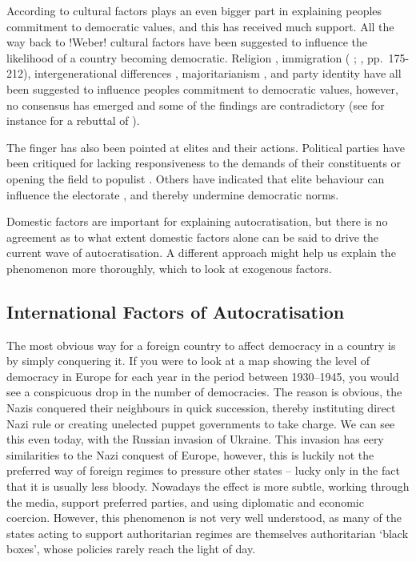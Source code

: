 According to \citet{margalit_economic_2019} cultural factors plays an even bigger part in explaining peoples commitment to democratic values, and this has received much support. All the way back to !Weber! cultural factors have been suggested to influence the likelihood of a country becoming democratic. Religion \citep[pp.72-85]{huntington_third_1991}, immigration (\citeauthor{dinas_waking_2019} \citeyear{dinas_waking_2019}; \citeauthor{norris_cultural_2019} \citeyear{norris_cultural_2019}, pp.~175-212), intergenerational differences \citep{foa_youth_2020, foa_danger_2016, norris_cultural_2019, wuttke_have_2022}, majoritarianism \citep{grossman_majoritarian_2022, wunsch_demand_2023}, and party identity \citep{abramowitz_united_2019, bisgaard_how_2019, graham_democracy_2020, iyengar_strengthening_2018, krishnarajan_rationalizing_2023, peterson_partisan_2021, singer_fiddling_2023} have all been suggested to influence peoples commitment to democratic values, however, no consensus has emerged and some of the findings are contradictory (see for instance \citeauthor{schafer_cultural_2022} \citeyear{schafer_cultural_2022} for a rebuttal of \citeauthor{norris_cultural_2019} \citeyear{norris_cultural_2019}). 

The finger has also been pointed at elites and their actions. Political parties have been critiqued for lacking responsiveness to the demands of their constituents or opening the field to populist \citep{berman_causes_2021, grzymala-busse_failure_2019}. Others have indicated that elite behaviour can influence the electorate \citep{broockman_causal_2017, clayton_elite_2021}, and thereby undermine democratic norms.

Domestic factors are important for explaining autocratisation, but there is no agreement as to what extent domestic factors alone can be said to drive the current wave of autocratisation. A different approach might help us explain the phenomenon more thoroughly, which to look at exogenous factors.

\subsection{International Factors of Autocratisation}
The most obvious way for a foreign country to affect democracy in a country is by simply conquering it. If you were to look at a map showing the level of democracy in Europe for each year in the period between 1930--1945, you would see a conspicuous drop in the number of democracies. The reason is obvious, the Nazis conquered their neighbours in quick succession, thereby instituting direct Nazi rule or creating unelected puppet governments to take charge. We can see this even today, with the Russian invasion of Ukraine. This invasion has eery similarities to the Nazi conquest of Europe, however, this is luckily not the preferred way of foreign regimes to pressure other states -- lucky only in the fact that it is usually less bloody. Nowadays the effect is more subtle, working through the media, support preferred parties, and using diplomatic and economic coercion. However, this phenomenon is not very well understood, as many of the states acting to support authoritarian regimes are themselves authoritarian `black boxes', whose policies rarely reach the light of day.  

